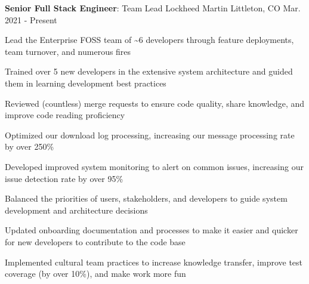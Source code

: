 


\begin{cventries}

\vspace{-.25em}
\cventry
{\textbf{Senior Full Stack Engineer}: Team Lead} %
{Lockheed Martin} %
{Littleton, CO} %
{Mar. 2021 - Present} %
{ %
\begin{cvitems}
    \item {Lead the Enterprise FOSS team of \textasciitilde{6} developers through feature deployments, team turnover, and numerous fires}
    \item {Trained over 5 new developers in the extensive system architecture and guided them in learning development best practices}
    \item {Reviewed (countless) merge requests to ensure code quality, share knowledge, and improve code reading proficiency}
    \item {Optimized our download log processing, increasing our message processing rate by over 250\%}
    \item {Developed improved system monitoring to alert on common issues, increasing our issue detection rate by over 95\%}
    \item {Balanced the priorities of users, stakeholders, and developers to guide system development and architecture decisions}
    \item {Updated onboarding documentation and processes to make it easier and quicker for new developers to contribute to the code base}
    \item {Implemented cultural team practices to increase knowledge transfer, improve test coverage (by over 10\%), and make work more fun}
\end{cvitems}
}


\end{cventries}
